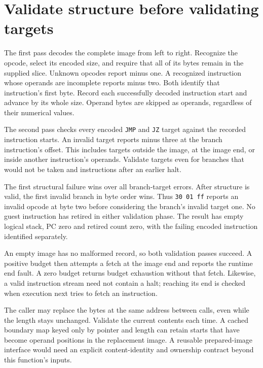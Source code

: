 \section{Validate structure before validating targets}\label{vm-phases}
The first pass decodes the complete image from left to right. Recognize the opcode,
select its encoded size, and require that all of its bytes remain in the supplied
slice. Unknown opcodes report minus one. A recognized instruction whose operands
are incomplete reports minus two. Both identify that instruction's first byte.
Record each successfully decoded instruction start and advance by its whole size.
Operand bytes are skipped as operands, regardless of their numerical values.

The second pass checks every encoded \texttt{JMP} and \texttt{JZ} target against
the recorded instruction starts. An invalid target reports minus three at the branch
instruction's offset. This includes targets outside the image, at the image end, or
inside another instruction's operands. Validate targets even for branches that would
not be taken and instructions after an earlier halt.

The first structural failure wins over all branch-target errors. After structure is
valid, the first invalid branch in byte order wins. Thus \texttt{30 01 ff} reports
an invalid opcode at byte two before considering the branch's invalid target one.
No guest instruction has retired in either validation phase. The result has empty
logical stack, PC zero and retired count zero, with the failing encoded instruction
identified separately.

An empty image has no malformed record, so both validation passes succeed. A positive
budget then attempts a fetch at the image end and reports the runtime end fault. A
zero budget returns budget exhaustion without that fetch. Likewise, a valid instruction
stream need not contain a halt; reaching its end is checked when execution next tries
to fetch an instruction.

The caller may replace the bytes at the same address between calls, even while the
length stays unchanged. Validate the current contents each time. A cached boundary
map keyed only by pointer and length can retain starts that have become operand
positions in the replacement image. A reusable prepared-image interface would need
an explicit content-identity and ownership contract beyond this function's inputs.
